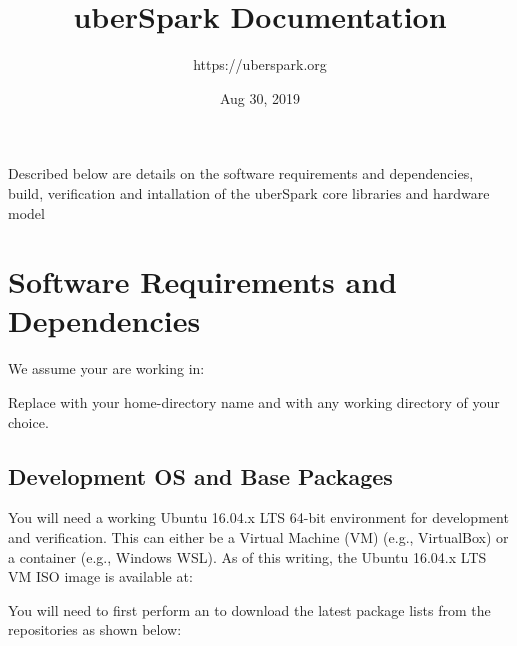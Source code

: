 \documentclass[letterpaper,10pt,english]{sphinxmanual}
\title{uberSpark Documentation}
\date{Aug 30, 2019}
\author{https://uberspark.org}
\begin{document}
\pagestyle{empty}
\sphinxmaketitle
\pagestyle{plain}
\sphinxtableofcontents
\pagestyle{normal}
\label{\detokenize{index::doc}}


Described below are details on the software requirements and
dependencies, build, verification and intallation of the uberSpark core
libraries and hardware model


\chapter{Software Requirements and Dependencies}
\label{\detokenize{sw-requirements:software-requirements-and-dependencies}}\label{\detokenize{sw-requirements::doc}}
We assume your are working in: 

Replace  with your home-directory name and 
with any working directory of your choice.


\section{Development OS and Base Packages}
\label{\detokenize{sw-requirements:development-os-and-base-packages}}
You will need a working Ubuntu 16.04.x LTS 64-bit environment for development and
verification. This can either be a Virtual Machine (VM) (e.g., VirtualBox) or a
container (e.g., Windows WSL). As of this writing, the Ubuntu 16.04.x LTS VM ISO
image is available at:

\begin{sphinxVerbatim}[commandchars=\\\{\}]
\end{sphinxVerbatim}

You will need to first perform an  to download the latest package
lists from the repositories as shown below:

\begin{sphinxVerbatim}[commandchars=\\\{\}]
  
\end{sphinxVerbatim}
\end{document}
